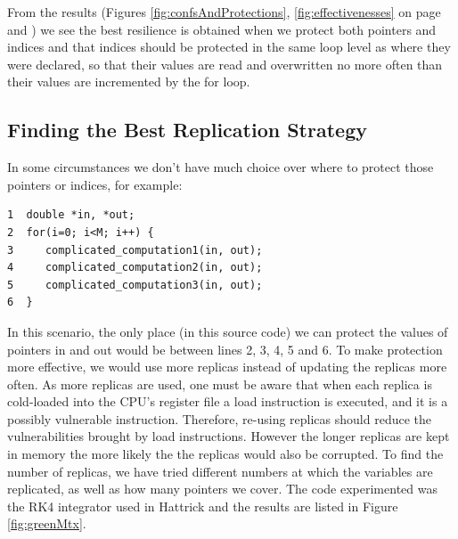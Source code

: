 \documentclass{article}
\begin{document}
From the results (Figures \ref{fig:confsAndProtections}, \ref{fig:effectivenesses} on page \pageref{fig:confsAndProtections} and \pageref{fig:effectivenesses}) we see the best resilience is obtained when we protect both pointers and indices and that indices should be protected in the same loop level as where they were declared, so that their values are read and overwritten no more often than their values are incremented by the for loop. 

\subsection{Finding the Best Replication Strategy}

In some circumstances we don't have much choice over where to protect those pointers or indices, for example:

\begin{center} \begin{verbatim}
1  double *in, *out;
2  for(i=0; i<M; i++) {
3     complicated_computation1(in, out);
4     complicated_computation2(in, out);
5     complicated_computation3(in, out);
6  }
\end{verbatim} \end{center}

In this scenario, the only place (in this source code) we can protect the values of pointers in and out would be between lines 2, 3, 4, 5 and 6. To make protection more effective, we would use more replicas instead of updating the replicas more often. As more replicas are used, one must be aware that when each replica is cold-loaded into the CPU's register file a load instruction is executed, and it is a possibly vulnerable instruction. Therefore, re-using replicas should reduce the vulnerabilities brought by load instructions. However the longer replicas are kept in memory the more likely the the replicas would also be corrupted. To find the number of replicas, we have tried different numbers at which the variables are replicated, as well as how many pointers we cover. The code experimented was the RK4 integrator used in Hattrick and the results are listed in Figure \ref{fig:greenMtx}.
\end{document}
